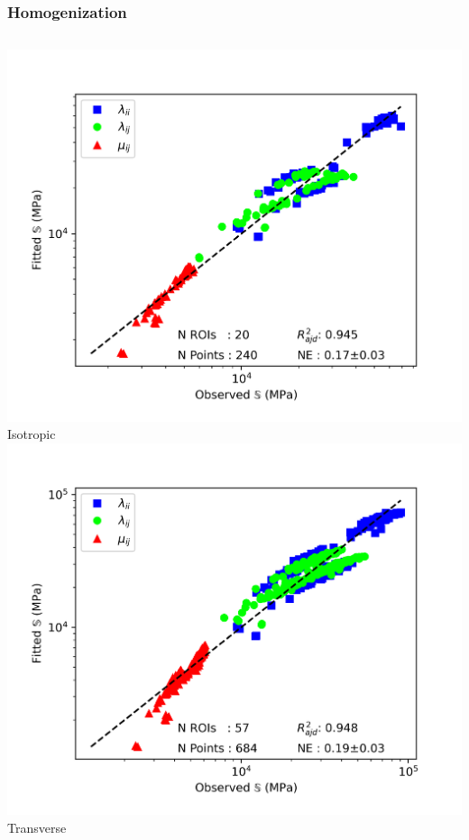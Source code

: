 \documentclass[xcolor=table,11pt]{beamer}
\begin{document}
	\begin{frame}
		\frametitle{Homogenization}
		\centering
		\begin{columns}
			\centering
			\includegraphics[width=\linewidth]{05_Homogenization/Plots/Regression_Iso}\\
			Isotropic
			\centering
			\includegraphics[width=\linewidth]{05_Homogenization/Plots/Regression_Tra}\\
			Transverse
			\centering

\end{columns}
\end{frame}
\end{document}

